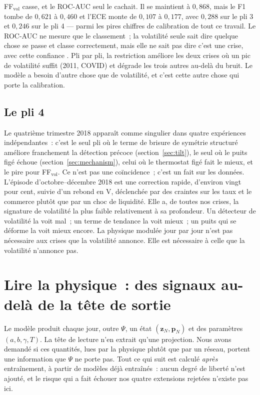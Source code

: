 \documentclass[11pt,a4paper]{article}
\newcommand{\Psiv}{\Psi}
\begin{document}
FF$_\mathrm{vol}$ casse, et le ROC-AUC seul le cachait. Il se maintient à $0{,}868$, mais le F1 tombe de $0{,}621$ à $0{,}460$ et l'ECE monte de $0{,}107$ à $0{,}177$, avec $0{,}288$ sur le pli 3 et $0{,}246$ sur le pli 4 --- parmi les pires chiffres de calibration de tout ce travail. Le ROC-AUC ne mesure que le classement~; la volatilité seule sait dire \og quelque chose se passe \fg{} et classe correctement, mais elle ne sait pas dire \og c'est une crise, avec cette confiance \fg{}. Pli par pli, la restriction améliore les deux crises où un pic de volatilité suffit (2011, COVID) et dégrade les trois autres au-delà du bruit. Le modèle a besoin d'autre chose que de volatilité, et c'est cette autre chose qui porte la calibration.

\subsection{Le pli 4}
\label{sec:fold4}

Le quatrième trimestre 2018 apparaît comme singulier dans quatre expériences indépendantes~: c'est le seul pli où le terme de brisure de symétrie structuré améliore franchement la détection précoce (section~\ref{sec:tilt}), le seul où le puits figé échoue (section~\ref{sec:mechanism}), celui où le thermostat figé fait le mieux, et le pire pour FF$_\mathrm{vol}$. Ce n'est pas une coïncidence~; c'est un fait sur les données. L'épisode d'octobre--décembre 2018 est une correction rapide, d'environ vingt pour cent, suivie d'un rebond en V, déclenchée par des craintes sur les taux et le commerce plutôt que par un choc de liquidité. Elle a, de toutes nos crises, la signature de volatilité la plus faible relativement à sa profondeur. Un détecteur de volatilité la voit mal~; un terme de tendance la voit mieux~; un puits qui se déforme la voit mieux encore. La physique modulée jour par jour n'est pas nécessaire aux crises que la volatilité annonce. Elle est nécessaire à celle que la volatilité n'annonce pas.

\FloatBarrier
\section{Lire la physique~: des signaux au-delà de la tête de sortie}
\label{sec:physics}

Le modèle produit chaque jour, outre $\Psiv$, un état $(\mathbf z_N,\mathbf p_N)$ et des paramètres $(a,b,\gamma,T)$. La tête de lecture n'en extrait qu'une projection. Nous avons demandé si ces quantités, lues par la physique plutôt que par un réseau, portent une information que $\Psiv$ ne porte pas. Tout ce qui suit est calculé \emph{après} entraînement, à partir de modèles déjà entraînés~: aucun degré de liberté n'est ajouté, et le risque qui a fait échouer nos quatre extensions rejetées n'existe pas ici.
\end{document}
